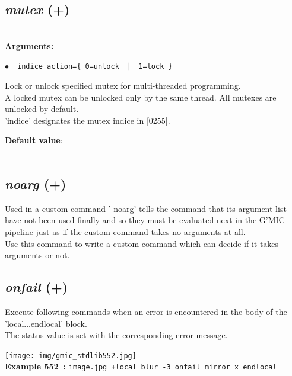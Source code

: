 \documentclass[a4paper,10.5pt,twoside]{book}
\def\comma{\discretionary{,}{}{,}}
\newcommand{\Cb}[1]{\textcolor{cb}{#1}}
\newcommand{\Cc}[1]{\textcolor{cc}{#1}}
\begin{document}
\subsection{\emph{mutex} (+)}\vspace*{-0.7em}
~\\\textbf{\Cb{Arguments: }}\begin{flushleft}
{\small \Cb{\hspace*{0.5cm}$\bullet$~~\texttt{indice{\comma}\_action=\{ 0=unlock ~$|$~ 1=lock \}}}}\end{flushleft}
Lock or unlock specified mutex for multi-threaded programming.
~\\A locked mutex can be unlocked only by the same thread. All mutexes are unlocked by default.
~\\'indice' designates the mutex indice{\comma} in [0{\comma}255].
\begin{flushleft}\Cc{\textbf{Default value}:\\~\\\hspace*{0.5cm}{\small $\bullet$~~\texttt{'action=1'.}}}\end{flushleft}


\subsection{\emph{noarg} (+)}\vspace*{-0.7em}
Used in a custom command{\comma} '-noarg' tells the command that its argument list have not been used
finally{\comma} and so they must be evaluated next in the G'MIC pipeline{\comma} just as if the custom
command takes no arguments at all.
~\\Use this command to write a custom command which can decide if it takes arguments or not.


\subsection{\emph{onfail} (+)}\vspace*{-0.7em}
Execute following commands when an error is encountered in the body of the 'local...endlocal' block.
~\\The status value is set with the corresponding error message.
\begin{center}\texttt{[image: img/gmic\_stdlib552.jpg]}\\
{\footnotesize \textbf{Example 552~:} \texttt{image.jpg +local blur -3 onfail mirror x endlocal}}
\end{center}
\end{document}
